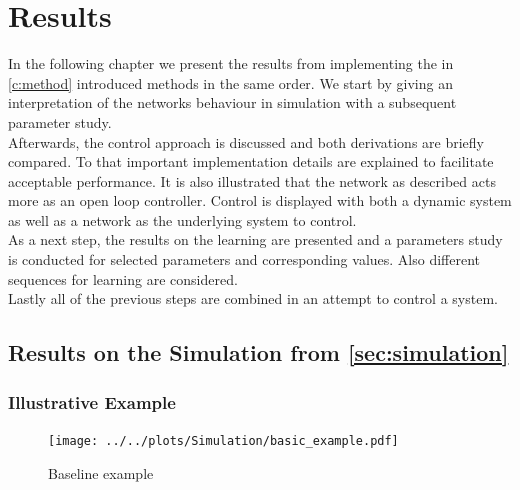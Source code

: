 \chapter{Results}\label{c:results}
In the following chapter we present the results from implementing the in \cref{c:method} introduced methods in the same order. We start by giving an interpretation of the networks behaviour in simulation with a subsequent parameter study.\\
Afterwards, the control approach is discussed and both derivations are briefly compared. To that important implementation details are explained to facilitate acceptable performance. It is also illustrated that the network as described acts more as an open loop controller. Control is displayed with both a dynamic system as well as a network as the underlying system to control.\\
As a next step, the results on the learning are presented and a parameters study is conducted for selected parameters and corresponding values. Also different sequences for learning are considered.\\
Lastly all of the previous steps are combined in an attempt to control a system.

\section{Results on the Simulation from \cref{sec:simulation}}\label{sec:res_simulation}
\subsection{Illustrative Example}
\begin{figure}[h!]
	\centering
	\centering
	\texttt{[image: ../../plots/Simulation/basic\_example.pdf]}
	\caption{Baseline example}
	\label{fig:sim_res_1}
\end{figure}

